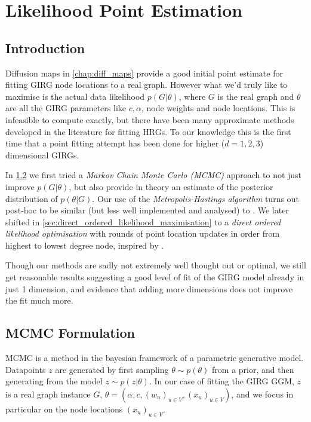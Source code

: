 \chapter{Likelihood Point Estimation}
\label{chap:likelihood_point_estimation}
\minitoc
\section{Introduction}
Diffusion maps in \cref{chap:diff_maps} provide a good initial point estimate for fitting GIRG node locations to a real graph. However what we'd truly like to maximise is the actual data likelihood $p(G | \theta)$, where $G$ is the real graph and $\theta$ are all the GIRG parameters like $c, \alpha$, node weights and node locations. This is infeasible to compute exactly, but there have been many approximate methods developed in the literature for fitting HRGs. To our knowledge this is the first time that a point fitting attempt has been done for higher ($d=1,2,3$) dimensional GIRGs.




In \cref{sec:mcmc_formulation} we first tried a \textit{Markov Chain Monte Carlo (MCMC)} approach to not just improve $p(G | \theta)$, but also provide in theory an estimate of the posterior distribution of $p(\theta | G)$. Our use of the \textit{Metropolis-Hastings algorithm} turns out post-hoc to be similar (but less well implemented and analysed) to \cite{boguna2010sustaining}. We later shifted in \cref{sec:direct_ordered_likelihood_maximisation} to a \textit{direct ordered likelihood optimisation} with rounds of point location updates in order from highest to lowest degree node, inspired by \cite{garcia2019mercator}.


Though our methods are sadly not extremely well thought out or optimal, we still get reasonable results suggesting a good level of fit of the GIRG model already in just 1 dimension, and evidence that adding more dimensions does not improve the fit much more.

\section{MCMC Formulation}
\label{sec:mcmc_formulation}
MCMC is a method in the bayesian framework of a parametric generative model. Datapoints $z$ are generated by first sampling $\theta \sim p(\theta)$ from a prior, and then generating from the model $z \sim p(z | \theta)$. In our case of fitting the GIRG GGM, $z$ is a real graph instance $G$, $\theta = (\alpha, c, (w_u)_{u \in V}, (x_u)_{u \in V})$, and we focus in particular on the node locations $(x_u)_{u \in V}$.

